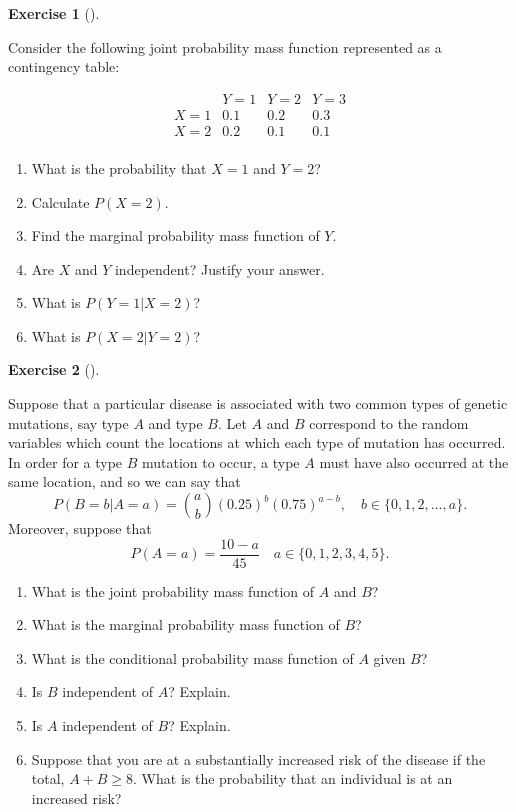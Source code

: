 \documentclass[
  letterpaper,
  DIV=11,
  numbers=noendperiod]{scrreprt}
\providecommand{\tightlist}{%
  \setlength{\itemsep}{0pt}\setlength{\parskip}{0pt}}\usepackage{longtable,booktabs,array}
\theoremstyle{definition}
\newtheorem{exercise}{Exercise}[chapter]
\theoremstyle{definition}
\theoremstyle{definition}
\theoremstyle{remark}
\begin{document}
\begin{exercise}[]\protect\hypertarget{exr-5.11}{}\label{exr-5.11}

Consider the following joint probability mass function represented as a
contingency table:

\[
\begin{array}{c|ccc}
    & Y = 1 & Y = 2 & Y = 3 \\
\hline
X = 1 & 0.1 & 0.2 & 0.3 \\
X = 2 & 0.2 & 0.1 & 0.1 \\
\end{array}
\]

\begin{enumerate}
\def\labelenumi{\alph{enumi}.}
\tightlist
\item
  What is the probability that \(X = 1\) and \(Y = 2\)?
\item
  Calculate \(P(X = 2)\).
\item
  Find the marginal probability mass function of \(Y\).
\item
  Are \(X\) and \(Y\) independent? Justify your answer.
\item
  What is \(P(Y=1|X=2)\)?
\item
  What is \(P(X = 2| Y = 2)\)?
\end{enumerate}

\end{exercise}

\begin{exercise}[]\protect\hypertarget{exr-5.12}{}\label{exr-5.12}

Suppose that a particular disease is associated with two common types of
genetic mutations, say type \(A\) and type \(B\). Let \(A\) and \(B\)
correspond to the random variables which count the locations at which
each type of mutation has occurred. In order for a type \(B\) mutation
to occur, a type \(A\) must have also occurred at the same location, and
so we can say that
\[P(B=b|A=a) = \binom{a}{b}(0.25)^b(0.75)^{a-b}, \quad b\in\{0,1,2,\dots, a\}.\]
Moreover, suppose that
\[P(A=a) = \frac{10-a}{45} \quad a\in\{0,1,2,3,4,5\}.\]

\begin{enumerate}
\def\labelenumi{\alph{enumi}.}
\tightlist
\item
  What is the joint probability mass function of \(A\) and \(B\)?
\item
  What is the marginal probability mass function of \(B\)?
\item
  What is the conditional probability mass function of \(A\) given
  \(B\)?
\item
  Is \(B\) independent of \(A\)? Explain.
\item
  Is \(A\) independent of \(B\)? Explain.
\item
  Suppose that you are at a substantially increased risk of the disease
  if the total, \(A+B \geq 8\). What is the probability that an
  individual is at an increased risk?
\end{enumerate}

\end{exercise}
\end{document}
